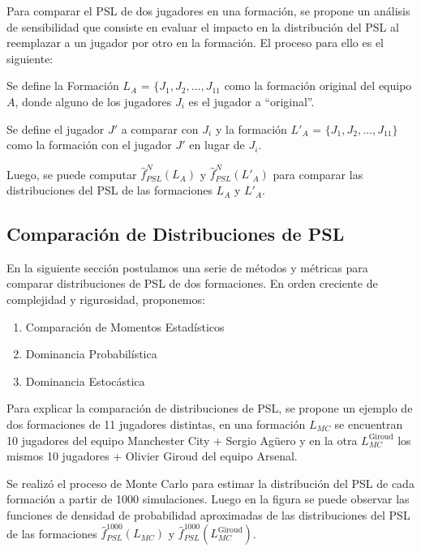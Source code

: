 \documentclass[
  a4paper,
]{article}
\providecommand{\tightlist}{%
  \setlength{\itemsep}{0pt}\setlength{\parskip}{0pt}}
\begin{document}
Para comparar el PSL de dos jugadores en una formación, se propone un
análisis de sensibilidad que consiste en evaluar el impacto en la
distribución del PSL al reemplazar a un jugador por otro en la
formación. El proceso para ello es el siguiente:

Se define la Formación \(L_A\) = \(\{J_1, J_2, \dots, J_{11}\) como la
formación original del equipo \(A\), donde alguno de los jugadores
\(J_i\) es el jugador a ``original''.

Se define el jugador \(J'\) a comparar con \(J_i\) y la formación
\(L'_A\) = \(\{J_1, J_2, \dots, J_{11}\}\) como la formación con el
jugador \(J'\) en lugar de \(J_i\).

Luego, se puede computar \(\hat{f}^{N}_{PSL}(L_A)\) y
\(\hat{f}^{N}_{PSL}(L'_A)\) para comparar las distribuciones del PSL de
las formaciones \(L_A\) y \(L'_A\).

\hypertarget{comparaciuxf3n-de-distribuciones-de-psl}{%
\subsection{Comparación de Distribuciones de
PSL}\label{comparaciuxf3n-de-distribuciones-de-psl}}

En la siguiente sección postulamos una serie de métodos y métricas para
comparar distribuciones de PSL de dos formaciones. En orden creciente de
complejidad y rigurosidad, proponemos:

\begin{enumerate}
\def\labelenumi{\arabic{enumi}.}
\tightlist
\item
  Comparación de Momentos Estadísticos
\item
  Dominancia Probabilística
\item
  Dominancia Estocástica
\end{enumerate}

Para explicar la comparación de distribuciones de PSL, se propone un
ejemplo de dos formaciones de 11 jugadores distintas, en una formación
\(L_{MC}\) se encuentran 10 jugadores del equipo Manchester City +
Sergio Agüero y en la otra \(L_{MC}^{\text{Giroud}}\) los mismos 10
jugadores + Olivier Giroud del equipo Arsenal.

Se realizó el proceso de Monte Carlo para estimar la distribución del
PSL de cada formación a partir de 1000 simulaciones. Luego en la figura
se puede observar las funciones de densidad de probabilidad aproximadas
de las distribuciones del PSL de las formaciones
\(\hat{f}^{1000}_{PSL}(L_{MC})\) y
\(\hat{f}^{1000}_{PSL}(L_{MC}^{\text{Giroud}})\).
\end{document}
